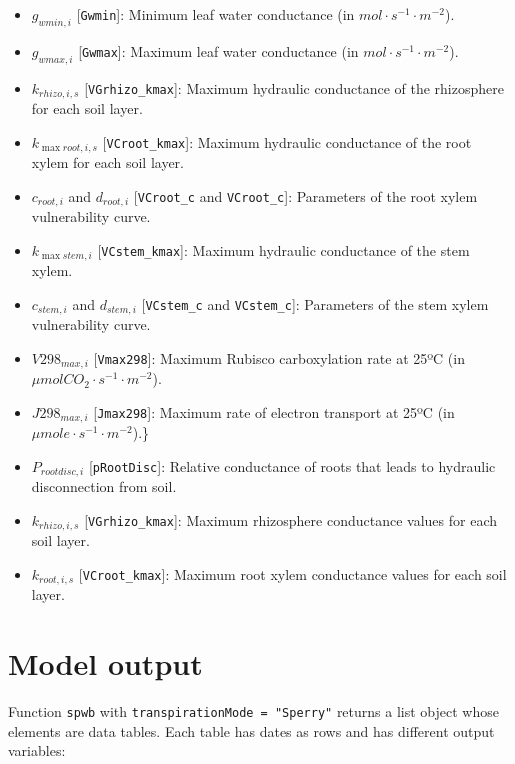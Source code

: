 \documentclass[]{book}
\providecommand{\tightlist}{%
  \setlength{\itemsep}{0pt}\setlength{\parskip}{0pt}}
\begin{document}
\begin{itemize}
\tightlist
\item
  \(g_{wmin,i}\) {[}\texttt{Gwmin}{]}: Minimum leaf water conductance
  (in \(mol·s^{-1}·m^{-2}\)).
\item
  \(g_{wmax,i}\) {[}\texttt{Gwmax}{]}: Maximum leaf water conductance
  (in \(mol·s^{-1}·m^{-2}\)).
\item
  \(k_{rhizo,i,s}\) {[}\texttt{VGrhizo\_kmax}{]}: Maximum hydraulic
  conductance of the rhizosphere for each soil layer.
\item
  \(k_{\max root,i,s}\) {[}\texttt{VCroot\_kmax}{]}: Maximum hydraulic
  conductance of the root xylem for each soil layer.
\item
  \(c_{root,i}\) and \(d_{root,i}\) {[}\texttt{VCroot\_c} and
  \texttt{VCroot\_c}{]}: Parameters of the root xylem vulnerability
  curve.
\item
  \(k_{\max stem,i}\) {[}\texttt{VCstem\_kmax}{]}: Maximum hydraulic
  conductance of the stem xylem.
\item
  \(c_{stem,i}\) and \(d_{stem,i}\) {[}\texttt{VCstem\_c} and
  \texttt{VCstem\_c}{]}: Parameters of the stem xylem vulnerability
  curve.
\item
  \(V298_{max,i}\) {[}\texttt{Vmax298}{]}: Maximum Rubisco carboxylation
  rate at 25ºC (in \(\mu mol CO_2·s^{-1}·m^{-2}\)).
\item
  \(J298_{max,i}\) {[}\texttt{Jmax298}{]}: Maximum rate of electron
  transport at 25ºC (in \(\mu mol e ·s^{-1}·m^{-2}\)).\}
\item
  \(P_{rootdisc,i}\) {[}\texttt{pRootDisc}{]}: Relative conductance of
  roots that leads to hydraulic disconnection from soil.
\item
  \(k_{rhizo,i,s}\) {[}\texttt{VGrhizo\_kmax}{]}: Maximum rhizosphere
  conductance values for each soil layer.
\item
  \(k_{root,i,s}\) {[}\texttt{VCroot\_kmax}{]}: Maximum root xylem
  conductance values for each soil layer.
\end{itemize}

\section{Model output}\label{model-output-1}

Function \texttt{spwb} with \texttt{transpirationMode\ =\ "Sperry"}
returns a list object whose elements are data tables. Each table has
dates as rows and has different output variables:
\end{document}
